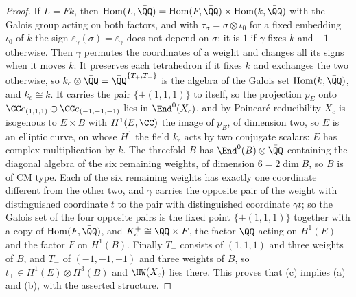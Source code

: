 \begin{proof}
If $L=Fk$, then $\operatorname{Hom}(L,\bar{\QQ})=\operatorname{Hom}(F,\bar{\QQ})
\times\operatorname{Hom}(k,\bar{\QQ})$ with the Galois group acting on both
factors, and with $\tau_{\sigma}=\sigma\otimes\iota_{0}$ for a fixed
embedding $\iota_{0}$ of $k$ the sign $\varepsilon_{\gamma}(\sigma)
=\varepsilon_{\gamma}$ does not depend on $\sigma$: it is $1$ if $\gamma$
fixes $k$ and $-1$ otherwise. Then $\gamma$ permutes the coordinates of a
weight and changes all its signs when it moves $k$. It preserves each
tetrahedron if it fixes $k$ and exchanges the two otherwise, so
$k_{c}\otimes\bar{\QQ}=\bar{\QQ}^{\{T_{+},T_{-}\}}$ is the algebra of the
Galois set $\operatorname{Hom}(k,\bar{\QQ})$, and $k_{c}\cong k$. It carries
the pair $\{\pm(1,1,1)\}$ to itself, so the projection $p_{E}$ onto
$\CC e_{(1,1,1)}\oplus\CC e_{(-1,-1,-1)}$ lies in $\End^{0}(X_{c})$, and by
Poincar\'e reducibility $X_{c}$ is isogenous to $E\times B$ with
$H^{1}(E,\CC)$ the image of $p_{E}$, of dimension two, so $E$ is an
elliptic curve, on whose $H^{1}$ the field $k_{c}$ acts by two conjugate
scalars: $E$ has complex multiplication by $k$. The threefold $B$ has
$\End^{0}(B)\otimes\bar{\QQ}$ containing the diagonal algebra of the six
remaining weights, of dimension $6=2\dim B$, so $B$ is of CM type. Each of
the six remaining weights has exactly one coordinate different from the
other two, and $\gamma$ carries the opposite pair of the weight with
distinguished coordinate $t$ to the pair with distinguished coordinate
$\gamma t$; so the Galois set of the four opposite pairs is the fixed point
$\{\pm(1,1,1)\}$ together with a copy of $\operatorname{Hom}(F,\bar{\QQ})$,
and $K_{c}^{+}\cong\QQ\times F$, the factor $\QQ$ acting on $H^{1}(E)$ and
the factor $F$ on $H^{1}(B)$. Finally $T_{+}$ consists of $(1,1,1)$ and
three weights of $B$, and $T_{-}$ of $(-1,-1,-1)$ and three weights of $B$,
so $t_{\pm}\in H^{1}(E)\otimes H^{3}(B)$ and $\HW(X_{c})$ lies there. This
proves that (c) implies (a) and (b), with the asserted structure.


\end{proof}

